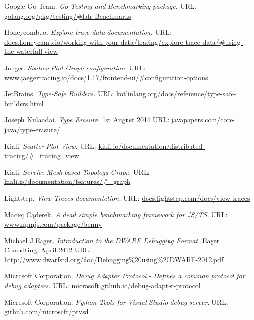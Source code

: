 \documentclass[12pt,pdftex,titlepage]{report}
\begin{document}
\begin{small}
\begin{thebibliography}{69}
        Google Go Team. \textit{Go Testing and Benchmarking package.}
        {\scriptsize URL:} \url{golang.org/pkg/testing/#hdr-Benchmarks}

        Honeycomb.io. \textit{Explore trace data documentation.}
        {\scriptsize URL:} \url{docs.honeycomb.io/working-with-your-data/tracing/explore-trace-data/#using-the-waterfall-view}

        Jaeger. \textit{Scatter Plot Graph configuration.}
        {\scriptsize URL:} \url{www.jaegertracing.io/docs/1.17/frontend-ui/#configuration-options}

        JetBrains. \textit{Type-Safe Builders.}
        {\scriptsize URL:} \url{kotlinlang.org/docs/reference/type-safe-builders.html}

        Joseph Kulandai. \textit{Type Erasure.}
        1st August 2014 
        {\scriptsize URL:} \url{javapapers.com/core-java/type-erasure/}

        Kiali. \textit{Scatter Plot View.} 
        {\scriptsize URL:} \url{kiali.io/documentation/distributed-tracing/#_tracing_view}

        Kiali. \textit{Service Mesh based Topology Graph.} 
        {\scriptsize URL:} \url{kiali.io/documentation/features/#_graph}

        Lightstep. \textit{View Traces documentation.}
        {\scriptsize URL:} \url{docs.lightstep.com/docs/view-traces}

        Maciej Cąderek. \textit{A dead simple benchmarking framework for JS/TS.}
        {\scriptsize URL:} \url{www.npmjs.com/package/benny}

        Michael J.Eager. \textit{Introduction to the DWARF Debugging Format.}
        Eager Consulting, April 2012
        {\scriptsize URL:} \url{http://www.dwarfstd.org/doc/Debugging%20using%20DWARF-2012.pdf}

        Microsoft Corporation. \textit{Debug Adapter Protocol - Defines a common protocol for debug adapters.}
        {\scriptsize URL:} \url{microsoft.github.io/debug-adapter-protocol}

        Microsoft Corporation. \textit{Python Tools for Visual Studio debug server.}
        {\scriptsize URL:} \url{github.com/microsoft/ptvsd}


\end{thebibliography}
\end{small}
\end{document}
